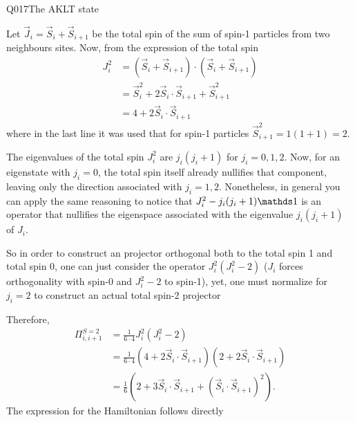 \begin{entry}{Q017}{The AKLT state}
\begin{solution}[Part (i)]
\end{solution}

\begin{solution}[Part (j)]
Let $\vec{J}_i= \vec{S}_i + \vec{S}_{i+1}$ be the total spin of the sum of spin-1 particles from two neighbours sites. Now, from the expression of the total spin
\begin{equation}
\begin{split}
    J_i^2 &= ( \vec{S}_i + \vec{S}_{i+1})\cdot( \vec{S}_i + \vec{S}_{i+1})\\
    &= \vec{S}_i^2 + 2  \vec{S}_i\cdot \vec{S}_{i+1}  + \vec{S}_{i+1}^2\\
    &= 4+ 2  \vec{S}_i\cdot \vec{S}_{i+1}
\end{split}
\end{equation}
where in the last line it was used that for spin-1 particles $\vec{S}_{i+1}^2=1(1+1)=2$. 

The eigenvalues of the total spin $J_i^2$ are $j_i(j_i+1)$ for $j_i=0,1,2$. Now, for an eigenstate with $j_i=0$, the total spin itself already nullifies that component, leaving only the direction associated with $j_i=1,2$. Nonetheless, in general you can apply the same reasoning to notice that $J_i^2-j_i(j_i+1)\id$ is an operator that nullifies the eigenspace associated with the eigenvalue $j_i(j_i+1)$ of $J_i$.

So in order to construct an projector orthogonal both to the total spin 1 and total spin 0, one can just consider the operator $J_i^2 (J_i^2 - 2)$ ($J_i$ forces orthogonality with spin-0 and $J_i^2 - 2$ to spin-1), yet, one must normalize for $j_i=2$ to construct an actual total spin-2 projector

Therefore,
\begin{equation}
    \begin{split}
        \Pi^{S=2}_{i,i+1} &= \frac{1}{6\cdot4} J_i^2 (J_i^2 - 2)\\
        &= \frac{1}{6\cdot4} \left( 4+ 2  \vec{S}_i\cdot \vec{S}_{i+1}\right) \left(2+ 2  \vec{S}_i\cdot \vec{S}_{i+1}\right)\\
        &= \frac{1}{6}\left( 2 + 3\vec{S}_i\cdot \vec{S}_{i+1} + \left(\vec{S}_i\cdot \vec{S}_{i+1}\right)^2\right).
    \end{split}
\end{equation}
The expression for the Hamiltonian follows directly

\end{solution}




\end{entry}